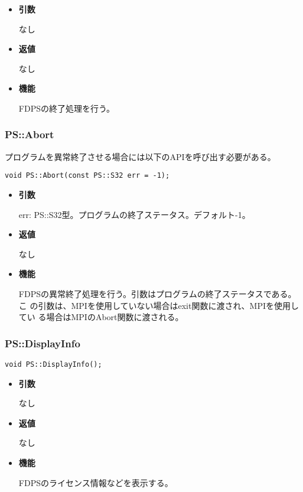 \begin{itemize}

\item {\bf 引数}

  なし

\item {\bf 返値}

  なし

\item {\bf 機能}

  FDPSの終了処理を行う。

\end{itemize}

\subsubsection{PS::Abort}

プログラムを異常終了させる場合には以下のAPIを呼び出す必要がある。
\begin{screen}
\begin{verbatim}
void PS::Abort(const PS::S32 err = -1);
\end{verbatim}
\end{screen}

\begin{itemize}

\item {\bf 引数}

  err: PS::S32型。プログラムの終了ステータス。デフォルト-1。

\item {\bf 返値}

  なし

\item {\bf 機能}

  FDPSの異常終了処理を行う。引数はプログラムの終了ステータスである。こ
  の引数は、MPIを使用していない場合はexit関数に渡され、MPIを使用してい
  る場合はMPIのAbort関数に渡される。

\end{itemize}

\subsubsection{PS::DisplayInfo}

\begin{screen}
\begin{verbatim}
void PS::DisplayInfo();
\end{verbatim}
\end{screen}

\begin{itemize}

\item {\bf 引数}

  なし

\item {\bf 返値}

  なし

\item {\bf 機能}

  FDPSのライセンス情報などを表示する。

\end{itemize}
